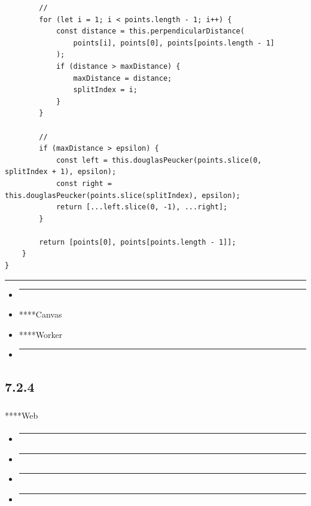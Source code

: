 \begin{verbatim}
        // 
        for (let i = 1; i < points.length - 1; i++) {
            const distance = this.perpendicularDistance(
                points[i], points[0], points[points.length - 1]
            );
            if (distance > maxDistance) {
                maxDistance = distance;
                splitIndex = i;
            }
        }
        
        // 
        if (maxDistance > epsilon) {
            const left = this.douglasPeucker(points.slice(0, splitIndex + 1), epsilon);
            const right = this.douglasPeucker(points.slice(splitIndex), epsilon);
            return [...left.slice(0, -1), ...right];
        }
        
        return [points[0], points[points.length - 1]];
    }
}
\end{verbatim}

\begin{center}\rule{0.5\linewidth}{0.5pt}\end{center}

\begin{itemize}
\item
  \begin{center}\rule{0.5\linewidth}{0.5pt}\end{center}
\item
  ****Canvas
\item
  ****Worker
\item
  \begin{center}\rule{0.5\linewidth}{0.5pt}\end{center}
\end{itemize}

\subsection{7.2.4}\label{section-29}

\subsubsection{}\label{section-30}

****Web

\paragraph{}\label{section-31}

\begin{itemize}
\item
  \begin{center}\rule{0.5\linewidth}{0.5pt}\end{center}
\item
  \begin{center}\rule{0.5\linewidth}{0.5pt}\end{center}
\item
  \begin{center}\rule{0.5\linewidth}{0.5pt}\end{center}
\item
  \begin{center}\rule{0.5\linewidth}{0.5pt}\end{center}
\end{itemize}

